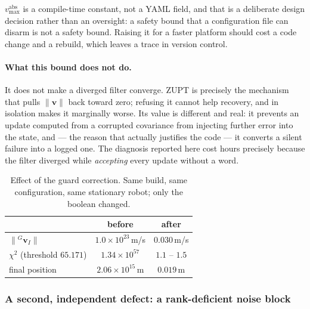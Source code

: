 $v_{\max}^{\mathrm{abs}}$ is a compile-time constant, not a YAML field, and
that is a deliberate design decision rather than an oversight: a safety bound
that a configuration file can disarm is not a safety bound. Raising it for a
faster platform should cost a code change and a rebuild, which leaves a trace
in version control.

\paragraph{What this bound does not do.} It does not make a diverged filter
converge. ZUPT is precisely the mechanism that pulls
$\lVert\mathbf{v}\rVert$ back toward zero; refusing it cannot help recovery,
and in isolation makes it marginally worse. Its value is different and real:
it prevents an update computed from a corrupted covariance from injecting
further error into the state, and --- the reason that actually justifies the
code --- it converts a silent failure into a logged one. The diagnosis
reported here cost hours precisely because the filter diverged while
\emph{accepting} every update without a word.

\begin{table}[htbp]
\centering
\caption{Effect of the guard correction. Same build, same configuration, same
stationary robot; only the boolean changed.}
\label{tab:zuptfix}
\begin{tabular}{lcc}
\hline
 & before & after \\
\hline
$\lVert {}^{G}\mathbf{v}_{I}\rVert$ & $1.0\times10^{23}$\,m/s & $0.030$\,m/s \\
$\chi^{2}$ (threshold $65.171$)     & $1.34\times10^{57}$ & $1.1$ -- $1.5$ \\
final position                      & $2.06\times10^{15}$\,m & $0.019$\,m \\
\hline
\end{tabular}
\end{table}

\subsubsection{A second, independent defect: a rank-deficient noise block}
\label{sssec:rank3}

